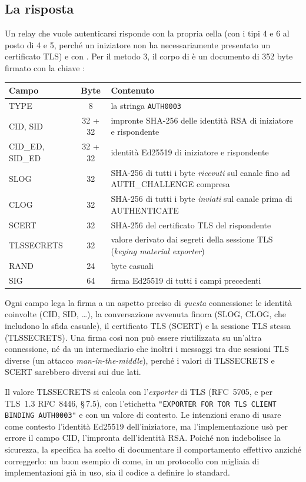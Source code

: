 \subsection{La risposta}

Un relay che vuole autenticarsi risponde con la propria cella  (con i tipi 4 e 6 al posto di 4 e 5, perché un iniziatore non ha necessariamente presentato un certificato TLS) e con . Per il metodo 3, il corpo di  è un documento di 352 byte firmato con la chiave :

\begin{center}\small
\begin{tabularx}{\textwidth}{@{}l c >{\raggedright\arraybackslash}X@{}}
\toprule
Campo & Byte & Contenuto \\
\midrule
TYPE & 8 & la stringa \texttt{AUTH0003} \\
CID, SID & 32 + 32 & impronte SHA-256 delle identità RSA di iniziatore e rispondente \\
CID\_ED, SID\_ED & 32 + 32 & identità Ed25519 di iniziatore e rispondente \\
SLOG & 32 & SHA-256 di tutti i byte \emph{ricevuti} sul canale fino ad AUTH\_CHALLENGE compresa \\
CLOG & 32 & SHA-256 di tutti i byte \emph{inviati} sul canale prima di AUTHENTICATE \\
SCERT & 32 & SHA-256 del certificato TLS del rispondente \\
TLSSECRETS & 32 & valore derivato dai segreti della sessione TLS (\emph{keying material exporter}) \\
RAND & 24 & byte casuali \\
SIG & 64 & firma Ed25519 di tutti i campi precedenti \\
\bottomrule
\end{tabularx}
\end{center}

Ogni campo lega la firma a un aspetto preciso di \emph{questa} connessione: le identità coinvolte (CID, SID, \ldots), la conversazione avvenuta finora (SLOG, CLOG, che includono la sfida casuale), il certificato TLS (SCERT) e la sessione TLS stessa (TLSSECRETS). Una firma così non può essere riutilizzata su un'altra connessione, né da un intermediario che inoltri i messaggi tra due sessioni TLS diverse (un attacco \emph{man-in-the-middle}), perché i valori di TLSSECRETS e SCERT sarebbero diversi sui due lati.

\begin{approfondimento}
Il valore TLSSECRETS si calcola con l'\emph{exporter} di TLS (RFC~5705, e per TLS~1.3 RFC~8446, §\,7.5), con l'etichetta \texttt{"EXPORTER FOR TOR TLS CLIENT BINDING AUTH0003"} e con un valore di contesto. Le intenzioni erano di usare come contesto l'identità Ed25519 dell'iniziatore, ma l'implementazione usò per errore il campo CID, l'impronta dell'identità RSA. Poiché non indebolisce la sicurezza, la specifica ha scelto di documentare il comportamento effettivo anziché correggerlo: un buon esempio di come, in un protocollo con migliaia di implementazioni già in uso, sia il codice a definire lo standard.
\end{approfondimento}


